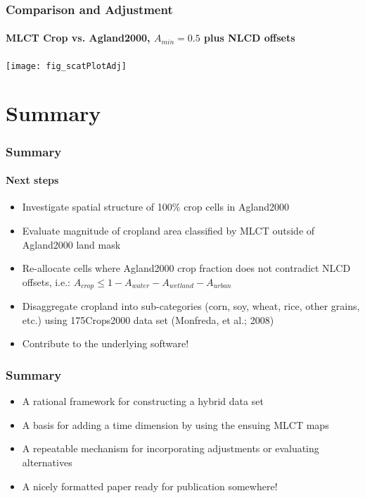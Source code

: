 \documentclass{beamer}
\begin{document}


\begin{frame}
  \frametitle{Comparison and Adjustment}
  \framesubtitle{MLCT Crop vs. Agland2000, $A_{min}=0.5$ plus NLCD offsets}
  \begin{center}
    \texttt{[image: fig\_scatPlotAdj]}    
  \end{center}
\end{frame}

\section*{Summary}

\begin{frame}
  \frametitle{Summary}
  \framesubtitle{Next steps}
  \begin{itemize}
  \item Investigate spatial structure of 100\% crop cells in Agland2000
  \item Evaluate magnitude of cropland area classified by MLCT outside of Agland2000 land mask
  \item Re-allocate cells where Agland2000 crop fraction does not contradict NLCD offsets, i.e.:
    $A_{crop} \leq 1-A_{water}-A_{wetland}-A_{urban}$
  \item Disaggregate cropland into sub-categories (corn, soy, wheat, rice, other grains, etc.) using 175Crops2000 data set (Monfreda, et al.; 2008)
  \item Contribute to the underlying software!
  \end{itemize}
\end{frame}

\begin{frame}
  \frametitle{Summary}
  \begin{itemize}
  \item A rational framework for constructing a hybrid data set
  \item A basis for adding a time dimension by using the ensuing MLCT maps
  \item A repeatable mechanism for incorporating adjustments or evaluating alternatives
  \item A nicely formatted paper ready for publication somewhere!
  \end{itemize}
\end{frame}


  
\end{document}

